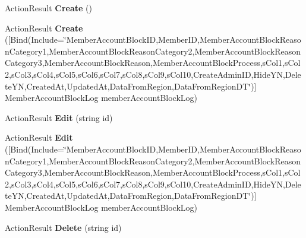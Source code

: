 \begin{DoxyCompactItemize}
\item 
Action\+Result {\bfseries Create} ()\hypertarget{class_cloud_bread_admin_web_1_1_controllers_1_1_member_account_block_logs_controller_ac59edd15b463a7195a49330c6fb2e6e8}{}\label{class_cloud_bread_admin_web_1_1_controllers_1_1_member_account_block_logs_controller_ac59edd15b463a7195a49330c6fb2e6e8}

\item 
Action\+Result {\bfseries Create} (\mbox{[}Bind(Include=\char`\"{}Member\+Account\+Block\+ID,Member\+ID,Member\+Account\+Block\+Reason\+Category1,Member\+Account\+Block\+Reason\+Category2,Member\+Account\+Block\+Reason\+Category3,Member\+Account\+Block\+Reason,Member\+Account\+Block\+Process,s\+Col1,s\+Col2,s\+Col3,s\+Col4,s\+Col5,s\+Col6,s\+Col7,s\+Col8,s\+Col9,s\+Col10,Create\+Admin\+ID,Hide\+YN,Delete\+YN,Created\+At,Updated\+At,Data\+From\+Region,Data\+From\+Region\+DT\char`\"{})\mbox{]} Member\+Account\+Block\+Log member\+Account\+Block\+Log)\hypertarget{class_cloud_bread_admin_web_1_1_controllers_1_1_member_account_block_logs_controller_aea8e7cb4932f4925e60ff2d8b5213f09}{}\label{class_cloud_bread_admin_web_1_1_controllers_1_1_member_account_block_logs_controller_aea8e7cb4932f4925e60ff2d8b5213f09}

\item 
Action\+Result {\bfseries Edit} (string id)\hypertarget{class_cloud_bread_admin_web_1_1_controllers_1_1_member_account_block_logs_controller_a00561b45ae5e34c72bde69d093a37812}{}\label{class_cloud_bread_admin_web_1_1_controllers_1_1_member_account_block_logs_controller_a00561b45ae5e34c72bde69d093a37812}

\item 
Action\+Result {\bfseries Edit} (\mbox{[}Bind(Include=\char`\"{}Member\+Account\+Block\+ID,Member\+ID,Member\+Account\+Block\+Reason\+Category1,Member\+Account\+Block\+Reason\+Category2,Member\+Account\+Block\+Reason\+Category3,Member\+Account\+Block\+Reason,Member\+Account\+Block\+Process,s\+Col1,s\+Col2,s\+Col3,s\+Col4,s\+Col5,s\+Col6,s\+Col7,s\+Col8,s\+Col9,s\+Col10,Create\+Admin\+ID,Hide\+YN,Delete\+YN,Created\+At,Updated\+At,Data\+From\+Region,Data\+From\+Region\+DT\char`\"{})\mbox{]} Member\+Account\+Block\+Log member\+Account\+Block\+Log)\hypertarget{class_cloud_bread_admin_web_1_1_controllers_1_1_member_account_block_logs_controller_a755fb108f13e226f65bcc7fe34adf5b6}{}\label{class_cloud_bread_admin_web_1_1_controllers_1_1_member_account_block_logs_controller_a755fb108f13e226f65bcc7fe34adf5b6}

\item 
Action\+Result {\bfseries Delete} (string id)\hypertarget{class_cloud_bread_admin_web_1_1_controllers_1_1_member_account_block_logs_controller_a01af082d42bbab54321d71eb1c34aebf}{}\label{class_cloud_bread_admin_web_1_1_controllers_1_1_member_account_block_logs_controller_a01af082d42bbab54321d71eb1c34aebf}


\end{DoxyCompactItemize}
